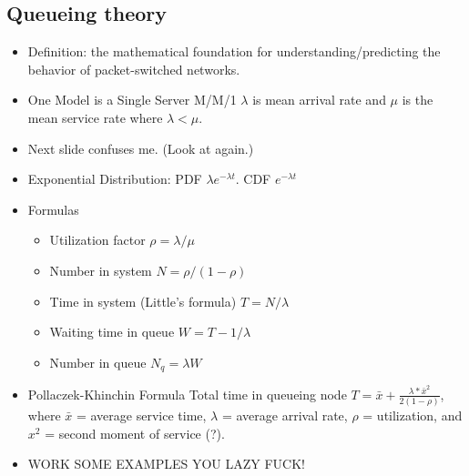 \documentclass{scrartcl}
\begin{document}
\subsection*{Queueing theory}
\begin{itemize}
\item Definition: the mathematical foundation for
understanding/predicting the behavior of packet-switched networks.
\item One Model is a Single Server M/M/1 $\lambda$ is mean arrival rate and
$\mu$ is the mean service rate where $\lambda < \mu$.
\item Next slide confuses me. (Look at again.)
\item Exponential Distribution: PDF $\lambda e^{-\lambda t}$. CDF 
$e^{-\lambda t}$
\item Formulas
\begin{itemize}
\item Utilization factor $\rho = \lambda/\mu$
\item Number in system $N = \rho / (1-\rho)$
\item Time in system (Little's formula) $T=N/\lambda$
\item Waiting time in queue $W=T-1/\lambda$
\item Number in queue $N_q = \lambda W$
\end{itemize}
\item Pollaczek-Khinchin Formula Total time in queueing node $T = \bar{x} +
\frac{\lambda * \bar{x}^2}{2(1-\rho)}$, where $\bar{x}$ = average service time,
$\lambda$ = average arrival rate, $\rho$ = utilization, and $x^2$ = second
moment of service (?).
\item WORK SOME EXAMPLES YOU LAZY FUCK!
\end{itemize}
\end{document}
